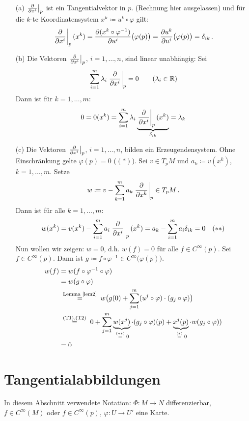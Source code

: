 \documentclass[a4paper,twoside,DIV15,BCOR12mm]{scrbook}
\renewcommand{\da}{\coloneqq}
\begin{document}
\begin{beweis}
\begin{enumerate}
\item[(a)] $\left.\frac{\partial}{\partial x^{i}}\right|_p$ ist ein Tangentialvektor in $p$. (Rechnung hier ausgelassen) und für die $k$-te Koordinatensystem $x^k\da u^k\circ \varphi$ gilt:
\[
\left.\frac{\partial}{\partial x^{i}}\right|_p(x^k) = \frac{\partial (x^k\circ\varphi^{-1})}{\partial u^i}\bigl(\varphi(p)\bigr) = \frac{\partial u^k}{\partial u^i}\bigl(\varphi(p)\bigr) = \delta_{ik}\,.
\]
\item[(b)] Die Vektoren $\left.\frac{\partial}{\partial x^{i}}\right|_p$, $i=1,\ldots,n$, sind linear unabhängig:
Sei 
\[
\sum_{i=1}^m \lambda_i \left.\frac{\partial}{\partial x^{i}}\right|_p = 0 
\qquad (\lambda_i\in\mathbb{R})
\]
Dann ist für $k=1,\ldots,m$:
\[
0 = 0(x^k) = 
\sum_{i=1}^m \lambda_i \underbrace{\left.\frac{\partial}{\partial x^{i}}\right|_p(x^k)}_{\delta_{ik}} = \lambda_k
\]
\item[(c)]  Die Vektoren $\left.\frac{\partial}{\partial x^{i}}\right|_p$, $i=1,\ldots,n$, bilden ein Erzeugendensystem. Ohne Einschränkung gelte $\varphi(p)=0$ ($(*)$). Sei $v\in T_pM$ und $a_k \da v(x^k)$, $k=1,\ldots,m$. Setze 
\[w\da v-\sum_{k=1}^m a_k \ptv{k} \in T_pM\,.\]
Dann ist für alle $k=1,\ldots,m$: 
\[
w(x^k) = v(x^k) - \sum_{i=1}^m  a_i \left.\frac{\partial}{\partial x^{i}}\right|_p (x^k) = a_k - \sum_{i=1}^m  a_i \delta_{ik} = 0 \quad (**)
\]
Nun wollen wir zeigen: $w=0$, d.h. $w(f) = 0$ für alle $f\in C^{\infty}(p)$.
Sei $f\in C^\infty(p)$. Dann ist $g \da f \circ \varphi^{-1} \in C^\infty\bigl(\varphi(p)\bigr)$.
\begin{align*}
w(f) &= w(f \circ \varphi^{-1} \circ \varphi) \\
&= w(g \circ \varphi) \\
&\gleichnach{Lemma \ref{lem2}} w\bigl( g(0) + \sum_{j=1}^m (u^j\circ\varphi )\cdot(g_j \circ \varphi ) \bigr) \\
& \gleichnach{(T1),(T2)} 0 + \sum_{j=1}^m \underbrace{w(x^j)}_{\gleichwegen{(**)}0} \cdot (g_j\circ\varphi)(p) + \underbrace{x^j(p)}_{\gleichwegen{(*)}0} \cdot w(g_j \circ\varphi ) ) \\
& = 0
\end{align*}
\end{enumerate}

\end{beweis}


\section{Tangentialabbildungen}

In diesem Abschnitt verwendete Notation: $\Phi: M\to N$ differenzierbar, $f\in C^\infty(M)$ oder $f\in C^\infty(p)$, $\varphi: U \to U'$ eine Karte.
\end{document}

